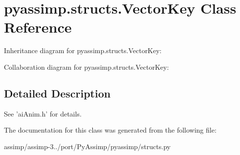 \hypertarget{classpyassimp_1_1structs_1_1_vector_key}{\section{pyassimp.\+structs.\+Vector\+Key Class Reference}
\label{classpyassimp_1_1structs_1_1_vector_key}
}


Inheritance diagram for pyassimp.\+structs.\+Vector\+Key\+:


Collaboration diagram for pyassimp.\+structs.\+Vector\+Key\+:


\subsection{Detailed Description}
\begin{DoxyVerb}See 'aiAnim.h' for details.
\end{DoxyVerb}
 

The documentation for this class was generated from the following file\+:\begin{DoxyCompactItemize}
\item 
assimp/assimp-\/3../port/\+Py\+Assimp/pyassimp/structs.\+py\end{DoxyCompactItemize}
